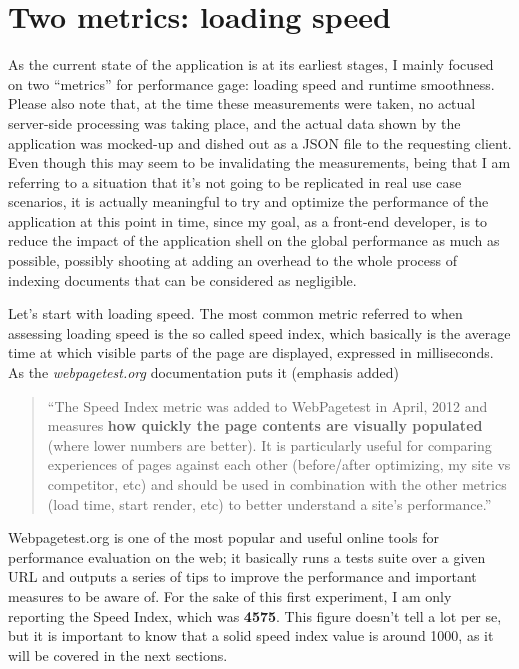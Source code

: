 \documentclass[12pt,svgnames]{memoir}
\newenvironment{quotationb}%
{\color{maincolor}\begin{leftbar}\begin{quotation}}%
{\end{quotation}\end{leftbar}\ignorespacesafterend}
\begin{document}
\section{Two metrics: loading speed}\label{two-metrics-loading-speed}

As the current state of the application is at its earliest stages, I
mainly focused on two ``metrics'' for performance gage: loading speed
and runtime smoothness. Please also note that, at the time these
measurements were taken, no actual server-side processing was taking
place, and the actual data shown by the application was mocked-up and
dished out as a JSON file to the requesting client. Even though this may
seem to be invalidating the measurements, being that I am referring to a
situation that it's not going to be replicated in real use case
scenarios, it is actually meaningful to try and optimize the performance
of the application at this point in time, since my goal, as a front-end
developer, is to reduce the impact of the application shell on the
global performance as much as possible, possibly shooting at adding an
overhead to the whole process of indexing documents that can be
considered as negligible.

Let's start with loading speed. The most common metric referred to when
assessing loading speed is the so called speed index, which basically is
the average time at which visible parts of the page are displayed,
expressed in milliseconds. As the \emph{webpagetest.org} documentation
puts it (emphasis added)

\begin{quotationb}
``The Speed Index metric was added to WebPagetest in April, 2012 and
measures \textbf{how quickly the page contents are visually populated}
(where lower numbers are better). It is particularly useful for
comparing experiences of pages against each other (before/after
optimizing, my site vs competitor, etc) and should be used in
combination with the other metrics (load time, start render, etc) to
better understand a site's performance.''
\end{quotationb}

Webpagetest.org is one of the most popular and useful online tools for
performance evaluation on the web; it basically runs a tests suite over
a given URL and outputs a series of tips to improve the performance and
important measures to be aware of. For the sake of this first
experiment, I am only reporting the Speed Index, which was
\textbf{4575}. This figure doesn't tell a lot per se, but it is
important to know that a solid speed index value is around 1000, as it
will be covered in the next sections.
\end{document}
